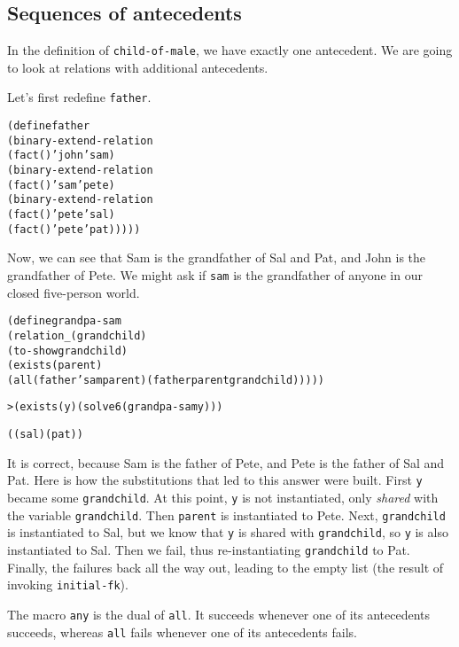 \subsection{Sequences of antecedents}

In the definition of \texttt{child-of-male}, we have exactly one
antecedent.  We are going to look at relations with additional
antecedents.

Let's first redefine \texttt{father}.

\begin{alltt}
(define father
  (binary-extend-relation
    (fact () 'john 'sam)
      (binary-extend-relation
        (fact () 'sam 'pete)
        (binary-extend-relation 
          (fact () 'pete 'sal)
          (fact () 'pete 'pat)))))
\end{alltt}

Now, we can see that Sam is the grandfather of Sal and Pat, and John
is the grandfather of Pete.  We might ask if \texttt{sam} is the
grandfather of anyone in our closed five-person world.  

\begin{alltt}
(define grandpa-sam
  (relation _ (grandchild)
    (to-show grandchild)
    (exists (parent)
      (all (father 'sam parent) (father parent grandchild)))))
\end{alltt}

\begin{alltt}
> (exists (y) (solve 6 (grandpa-sam y)))

((sal) (pat))
\end{alltt}

It is correct, because Sam is the father of Pete, and
Pete is the father of Sal and Pat.  Here is
how the substitutions that led to this answer were built.  First
\texttt{y} became some \texttt{grandchild}.  At this point, \texttt{y}
is not instantiated, only \emph{shared} with the variable
\texttt{grandchild}.  Then \texttt{parent} is instantiated to
Pete.  Next, \texttt{grandchild} is instantiated to
Sal, but we know that \texttt{y} is shared with
\texttt{grandchild}, so \texttt{y} is also instantiated to
Sal.  Then we fail, thus re-instantiating \texttt{grandchild}
to Pat.  Finally, the failures back all the way out, leading
to the empty list (the result of invoking \texttt{initial-fk}).

The macro \texttt{any} is the dual of \texttt{all}.  It
succeeds whenever one of its antecedents succeeds, whereas
\texttt{all} fails whenever one of its antecedents fails.  

